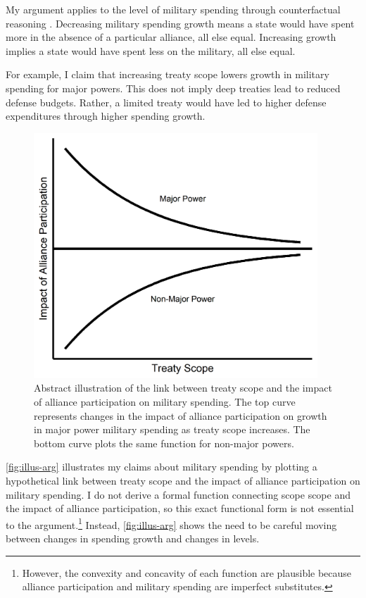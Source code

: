 \documentclass[12pt]{article}
\begin{document}
My argument applies to the level of military spending through counterfactual reasoning \citep{Fearon1991}. 
Decreasing military spending growth means a state would have spent more in the absence of a particular alliance, all else equal. 
Increasing growth implies a state would have spent less on the military, all else equal.


For example, I claim that increasing treaty scope lowers growth in military spending for major powers. 
This does not imply deep treaties lead to reduced defense budgets. 
Rather, a limited treaty would have led to higher defense expenditures through higher spending growth. 


\begin{figure}[htbp]
	\centering
		\includegraphics[width=0.95\textwidth]{../figures/illus-arg.png}
	\caption{Abstract illustration of the link between treaty scope and the impact of alliance participation on military spending.
	The top curve represents changes in the impact of alliance participation on growth in major power military spending as treaty scope increases.
	The bottom curve plots the same function for non-major powers.}
	\label{fig:illus-arg}
\end{figure}


\autoref{fig:illus-arg} illustrates my claims about military spending by plotting a hypothetical link between treaty scope and the impact of alliance participation on military spending. 
I do not derive a formal function connecting scope scope and the impact of alliance participation, so this exact functional form is not essential to the argument.\footnote{However, the convexity and concavity of each function are plausible because alliance participation and military spending are imperfect substitutes.}  
Instead, \autoref{fig:illus-arg} shows the need to be careful moving between changes in spending growth and changes in levels. 
\end{document}
